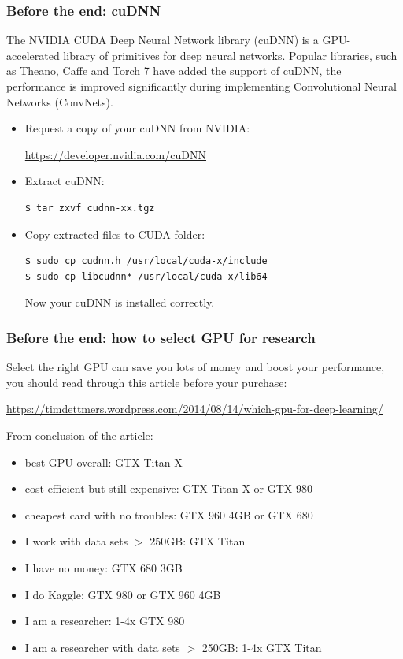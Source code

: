 \documentclass{beamer}
\begin{document}
\begin{frame}[fragile]
  \frametitle{Before the end: cuDNN}

  The NVIDIA CUDA Deep Neural Network library (cuDNN) is a GPU-accelerated library of primitives for deep neural networks. Popular libraries, such as Theano, Caffe and Torch 7 have added the support of cuDNN, the performance is improved significantly during implementing Convolutional Neural Networks (ConvNets).

  \begin{itemize}
    \item Request a copy of your cuDNN from NVIDIA:

      \url{https://developer.nvidia.com/cuDNN}
    \item Extract cuDNN:
\begin{verbatim}
$ tar zxvf cudnn-xx.tgz
\end{verbatim}
    \item Copy extracted files to CUDA folder:
\begin{verbatim}
$ sudo cp cudnn.h /usr/local/cuda-x/include
$ sudo cp libcudnn* /usr/local/cuda-x/lib64
\end{verbatim}
      Now your cuDNN is installed correctly.
  \end{itemize}
\end{frame}

\begin{frame}
\frametitle{Before the end: how to select GPU for research}

Select the right GPU can save you lots of money and boost your performance, you should read through this article before your purchase:

\url{https://timdettmers.wordpress.com/2014/08/14/which-gpu-for-deep-learning/}

From conclusion of the article:
\small
\begin{itemize}
\item[\ding{96}] best GPU overall: GTX Titan X
\item[\ding{96}] cost efficient but still expensive: GTX Titan X or GTX 980
\item[\ding{96}] cheapest card with no troubles: GTX 960 4GB or GTX 680
\item[\ding{96}] I work with data sets $>$ 250GB: GTX Titan
\item[\ding{96}] I have no money: GTX 680 3GB
\item[\ding{96}] I do Kaggle: GTX 980 or GTX 960 4GB
\item[\ding{96}] I am a researcher: 1-4x GTX 980
\item[\ding{96}] I am a researcher with data sets $>$ 250GB: 1-4x GTX Titan
\end{itemize}

\end{frame}
\end{document}
